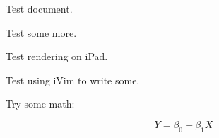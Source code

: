 \documentclass{article}
\begin{document}
Test document.

Test some more.

Test rendering on iPad.

Test using iVim to write some.

Try some math: 

\begin{equation*}
	Y = \beta_0 + \beta_1 X
\end{equation*}
\end{document}
